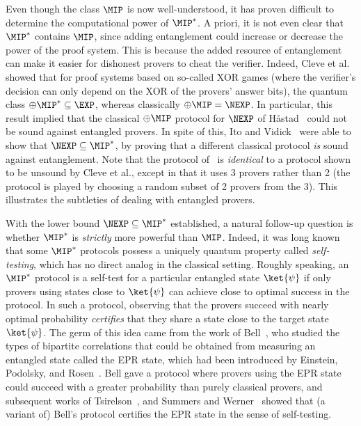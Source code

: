 \documentclass[11pt]{article}
\begin{document}
Even though the class $\MIP$ is now well-understood, it has proven difficult to
determine the computational power of $\MIP^*$. A priori, it is not
even clear that  $\MIP^*$ contains $\MIP$, since adding entanglement could increase or decrease the power of
the proof system. This is because the added resource of entanglement
can make it easier for dishonest provers to cheat the verifier. Indeed, Cleve et al.~\cite{CHTW04} showed that for proof systems
based on so-called XOR games (where the verifier's decision can only
depend on the XOR of the provers' answer bits), the quantum class
$\oplus\MIP^* \subseteq \EXP$, whereas classically $\oplus\MIP =
\NEXP$. In particular, this result implied that the classical
$\oplus\MIP$ protocol for $\NEXP$ of H{\aa}stad~\cite{Has97} could not be sound against entangled
provers.
In spite of this, Ito and Vidick~\cite{IV12,Vid16} were able to show that $\NEXP \subseteq
\MIP^*$, by proving that a different classical protocol \emph{is}
sound against entanglement. Note that the protocol of~\cite{Vid16} is
\emph{identical} to a protocol shown to be unsound by Cleve et al.,
except in that it uses 3 provers rather than 2 (the protocol is played
by choosing a random subset of 2 provers from the 3). This illustrates
the subtleties of dealing with entangled provers.

With the lower bound $\NEXP \subseteq \MIP^*$ established, a natural
follow-up question is whether $\MIP^*$ is \emph{strictly} more powerful
than $\MIP$. Indeed, it was long known that some $\MIP^*$ protocols
possess a uniquely quantum property called \emph{self-testing}, which
has no direct analog in the classical setting. Roughly speaking, an $\MIP^*$ protocol is
a self-test for a particular entangled state $\ket{\psi}$ if only
provers using states close to $\ket{\psi}$ can achieve close to optimal
success in the protocol. In such a protocol, observing that the
provers succeed with nearly optimal probability \emph{certifies} that
they share a state close to the target state $\ket{\psi}$. The germ of
this idea came from the work of Bell~\cite{Bel64}, who studied the types of
bipartite correlations that could be obtained from measuring an
entangled state called the EPR state, which had been introduced by
Einstein, Podolsky, and Rosen~\cite{EPR35}. Bell gave a protocol where
provers using the EPR state could succeed with a greater probability
than purely classical provers, and subsequent works of Tsirelson~\cite{Tsi80}, and Summers and
Werner~\cite{SW88} showed that (a variant of) Bell's protocol certifies
the EPR state in the sense of self-testing.
\end{document}
